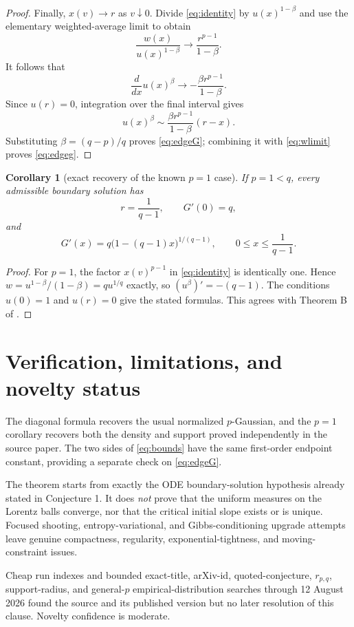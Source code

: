 \documentclass[10pt]{article}
\newtheorem{corollary}[theorem]{Corollary}
\begin{document}
\begin{proof}
Finally, $x(v)\to r$ as $v\downarrow0$.  Divide \eqref{eq:identity} by
$u(x)^{1-\beta}$ and use the elementary weighted-average limit to obtain
\begin{equation}\label{eq:wlimit}
 \frac{w(x)}{u(x)^{1-\beta}}
 \longrightarrow \frac{r^{p-1}}{1-\beta}.
\end{equation}
It follows that
\[
 \frac{d}{dx}u(x)^\beta
 \longrightarrow-\frac{\beta r^{p-1}}{1-\beta}.
\]
Since $u(r)=0$, integration over the final interval gives
\[
 u(x)^\beta\sim
 \frac{\beta r^{p-1}}{1-\beta}(r-x).
\]
Substituting $\beta=(q-p)/q$ proves \eqref{eq:edgeG}; combining it with
\eqref{eq:wlimit} proves \eqref{eq:edgeg}.
\end{proof}

\begin{corollary}[exact recovery of the known $p=1$ case]
If $p=1<q$, every admissible boundary solution has
\[
 r=\frac1{q-1},\qquad G'(0)=q,
\]
and
\[
 G'(x)=q\bigl(1-(q-1)x\bigr)^{1/(q-1)},
 \qquad 0\le x\le\frac1{q-1}.
\]
\end{corollary}

\begin{proof}
For $p=1$, the factor $x(v)^{p-1}$ in \eqref{eq:identity} is identically
one.  Hence $w=u^{1-\beta}/(1-\beta)=q u^{1/q}$ exactly, so
$(u^\beta)'=-(q-1)$.  The conditions $u(0)=1$ and $u(r)=0$ give the stated
formulas.  This agrees with Theorem B of \cite{KPS}.
\end{proof}

\section*{Verification, limitations, and novelty status}

The diagonal formula recovers the usual normalized $p$-Gaussian, and the
$p=1$ corollary recovers both the density and support proved independently in
the source paper.  The two sides of \eqref{eq:bounds} have the same first-order
endpoint constant, providing a separate check on \eqref{eq:edgeG}.

The theorem starts from exactly the ODE boundary-solution hypothesis already
stated in Conjecture 1.  It does
\emph{not} prove that the uniform measures on the Lorentz balls converge, nor
that the critical initial slope exists or is unique.  Focused shooting,
entropy-variational, and Gibbs-conditioning upgrade attempts leave genuine
compactness, regularity, exponential-tightness, and moving-constraint issues.

Cheap run indexes and bounded exact-title, arXiv-id, quoted-conjecture,
$r_{p,q}$, support-radius, and general-$p$ empirical-distribution searches
through 12 August 2026 found the source and its published version but no later
resolution of this clause.  Novelty confidence is moderate.
\end{document}
